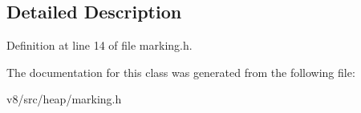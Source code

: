 \subsection{Detailed Description}


Definition at line 14 of file marking.\+h.



The documentation for this class was generated from the following file\+:\begin{DoxyCompactItemize}
\item 
v8/src/heap/marking.\+h\end{DoxyCompactItemize}
